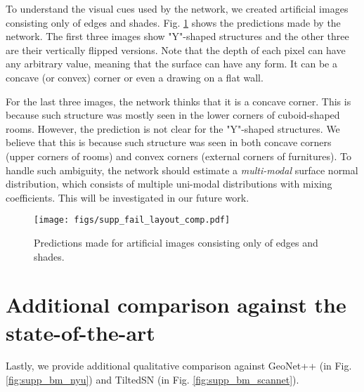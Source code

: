 \documentclass[10pt,twocolumn,letterpaper]{article}
\begin{document}
To understand the visual cues used by the network, we created artificial images consisting only of edges and shades. Fig. \ref{fig:supp_fail_layout} shows the predictions made by the network. The first three images show "Y"-shaped structures and the other three are their vertically flipped versions. Note that the depth of each pixel can have any arbitrary value, meaning that the surface can have any form. It can be a concave (or convex) corner or even a drawing on a flat wall.

For the last three images, the network thinks that it is a concave corner. This is because such structure was mostly seen in the lower corners of cuboid-shaped rooms. However, the prediction is not clear for the "Y"-shaped structures. We believe that this is because such structure was seen in both concave corners (upper corners of rooms) and convex corners (external corners of furnitures). To handle such ambiguity, the network should estimate a \textit{multi-modal} surface normal distribution, which consists of multiple uni-modal distributions with mixing coefficients. This will be investigated in our future work.

\begin{figure}[h]
\begin{center}
\texttt{[image: figs/supp\_fail\_layout\_comp.pdf]}
\end{center}
\caption{Predictions made for artificial images consisting only of edges and shades.}
\label{fig:supp_fail_layout}
\end{figure}


\section{Additional comparison against the state-of-the-art}
\label{sec:qualitative}

Lastly, we provide additional qualitative comparison against GeoNet++ \cite{SNfromRGB_20_GeoNet++} (in Fig. \ref{fig:supp_bm_nyu}) and TiltedSN \cite{SNfromRGB_20_TiltedSN} (in Fig. \ref{fig:supp_bm_scannet}).


\end{document}
